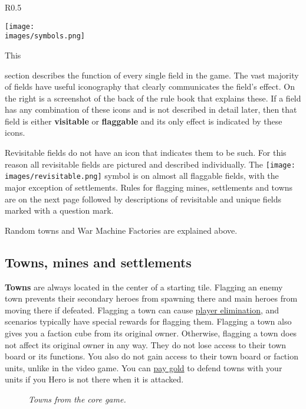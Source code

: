\begin{wrapfigure}{R}{0.5\textwidth}
    \begin{center}
    \texttt{[image: \\images/symbols.png]}
    \end{center}
\end{wrapfigure}
\hypertarget{All}{This} section describes the function of every single field in the game.
The vast majority of fields have useful iconography that clearly communicates the field's effect.
On the right is a screenshot of the back of the rule book that explains these.
If a field has any combination of these icons and is not described in detail later, then that field is either \textbf{visitable} or \textbf{flaggable} and its only effect is indicated by these icons.\par
Revisitable fields do not have an icon that indicates them to be such.
For this reason all revisitable fields are pictured and described individually.
The \texttt{[image: \\images/revisitable.png]} symbol is on almost all flaggable fields, with the major exception of settlements.
Rules for flagging mines, settlements and towns are on the next page followed by descriptions of revisitable and unique fields marked with a question mark.\par
Random towns and War Machine Factories are explained above.

\clearpage
\subsection*{Towns, mines and settlements}
\textbf{Towns} are always located in the center of a starting tile.
Flagging an enemy town prevents their secondary heroes from spawning there and main heroes from moving there if defeated.
Flagging a town can cause \hyperlink{End}{player elimination}, and scenarios typically have special rewards for flagging them.
Flagging a town also gives you a faction cube from its original owner.
Otherwise, flagging a town does not affect its original owner in any way.
They do not lose access to their town board or its functions.
You also do not gain access to their town board or faction units, unlike in the video game.
You can \hyperlink{Town}{pay gold} to defend towns with your units if you Hero is not there when it is attacked.\\
\begin{figure}[h]
\centering
{}
\caption{\textit{Towns from the core game.}}
\end{figure}

